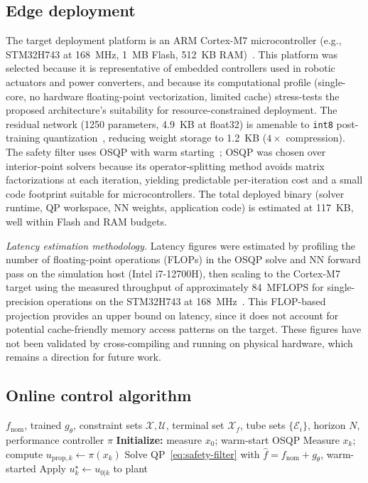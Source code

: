 \documentclass[12pt,a4paper]{article}
\begin{document}
\subsection{Edge deployment}
\label{subsec:edge}

The target deployment platform is an ARM Cortex-M7 microcontroller
(e.g., STM32H743 at 168~MHz, 1~MB Flash, 512~KB
RAM)~\cite{salzmann2023neuralMPC}. This platform was selected because
it is representative of embedded controllers used in robotic actuators
and power converters, and because its computational profile (single-core,
no hardware floating-point vectorization, limited cache) stress-tests
the proposed architecture's suitability for resource-constrained
deployment. The residual network (1250 parameters, 4.9~KB at float32)
is amenable to \texttt{int8} post-training
quantization~\cite{liang2021pruning}, reducing weight storage to
1.2~KB ($4\times$ compression). The safety filter uses OSQP with warm
starting~\cite{stellato2020osqp}; OSQP was chosen over interior-point
solvers because its operator-splitting method avoids matrix
factorizations at each iteration, yielding predictable per-iteration
cost and a small code footprint suitable for microcontrollers. The
total deployed binary (solver runtime, QP workspace, NN weights,
application code) is estimated at 117~KB, well within Flash and RAM
budgets.

\textit{Latency estimation methodology.} Latency figures were estimated
by profiling the number of floating-point operations (FLOPs) in the
OSQP solve and NN forward pass on the simulation host (Intel i7-12700H),
then scaling to the Cortex-M7 target using the measured throughput of
approximately 84~MFLOPS for single-precision operations on the
STM32H743 at 168~MHz~\cite{salzmann2023neuralMPC}.
This FLOP-based projection provides an upper bound on latency, since
it does not account for potential cache-friendly memory access patterns
on the target. These figures have not been validated by cross-compiling
and running on physical hardware, which remains a direction for future
work.

\subsection{Online control algorithm}
\label{subsec:algorithm}

\begin{algorithm}[t]
\caption{Modular Safe-PIML Control Loop}
\label{alg:safe-piml}
\begin{algorithmic}[1]
\Require $f_{\mathrm{nom}}$, trained $g_\theta$, constraint sets
  $\mathcal{X},\mathcal{U}$, terminal set $\mathcal{X}_f$, tube sets
  $\{\mathcal{E}_i\}$, horizon $N$, performance controller $\pi$
\State \textbf{Initialize:} measure $x_0$; warm-start OSQP
  \State Measure $x_k$; compute $u_{\mathrm{prop},k} \gets \pi(x_k)$
  \State Solve QP~\eqref{eq:safety-filter} with
    $\hat{f} = f_{\mathrm{nom}} + g_\theta$, warm-started
  \State Apply $u_k^\star \gets u_{0|k}$ to plant
\EndFor
\end{algorithmic}
\end{algorithm}
\end{document}
